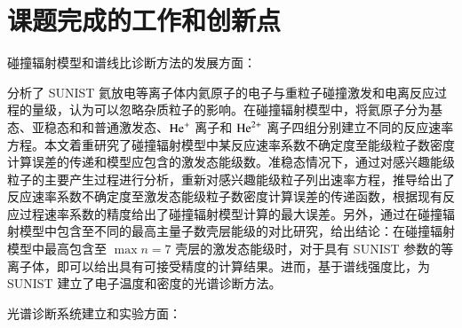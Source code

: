 \section{课题完成的工作和创新点}

碰撞辐射模型和谱线比诊断方法的发展方面：

分析了 SUNIST 氦放电等离子体内氦原子的电子与重粒子碰撞激发和电离反应过程的量级，认为可以忽略杂质粒子的影响。在碰撞辐射模型中，将氦原子分为基态、亚稳态和和普通激发态、${\rm He}^+$ 离子和 ${\rm He}^{2+}$ 离子四组分别建立不同的反应速率方程。本文着重研究了碰撞辐射模型中某反应速率系数不确定度至能级粒子数密度计算误差的传递和模型应包含的激发态能级数。准稳态情况下，通过对感兴趣能级粒子的主要产生过程进行分析，重新对感兴趣能级粒子列出速率方程，推导给出了反应速率系数不确定度至激发态能级粒子数密度计算误差的传递函数，根据现有反应过程速率系数的精度给出了碰撞辐射模型计算的最大误差。另外，通过在碰撞辐射模型中包含至不同的最高主量子数壳层能级的对比研究，给出结论：在碰撞辐射模型中最高包含至 $\max n = 7$ 壳层的激发态能级时，对于具有 SUNIST 参数的等离子体，即可以给出具有可接受精度的计算结果。进而，基于谱线强度比，为 SUNIST 建立了电子温度和密度的光谱诊断方法。

光谱诊断系统建立和实验方面：

